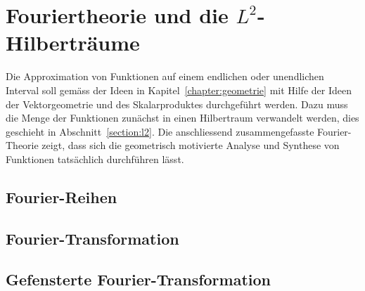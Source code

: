 %
%
%
\chapter{Fouriertheorie und die $L^2$-Hilberträume
\label{chapter:fourier}}
Die Approximation von Funktionen auf einem endlichen oder unendlichen
Interval soll gemäss der Ideen in Kapitel~\ref{chapter:geometrie}
mit Hilfe der Ideen der Vektorgeometrie und des Skalarproduktes
durchgeführt werden.
Dazu muss die Menge der Funktionen zunächst in einen Hilbertraum
verwandelt werden, dies geschieht in Abschnitt~\ref{section:l2}.
Die anschliessend zusammengefasste Fourier-Theorie zeigt, dass sich
die geometrisch motivierte Analyse und Synthese von Funktionen
tatsächlich durchführen lässt.




\section{Fourier-Reihen}



\section{Fourier-Transformation}



\section{Gefensterte Fourier-Transformation}


